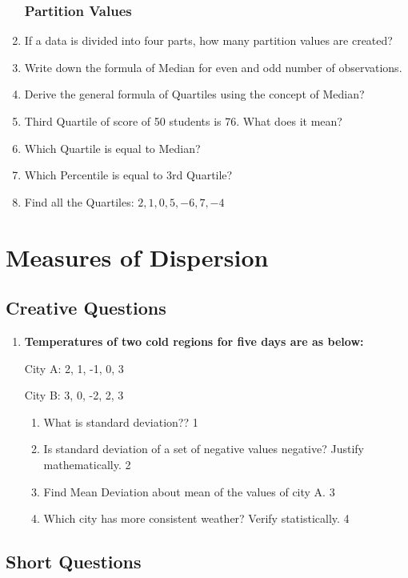 \documentclass[a4paper,oneside]{book}
\begin{document}
\begin{enumerate}
\subsection{Partition Values}
    \item If a data is divided into four parts, how many partition values are created?
    \item Write down the formula of Median for even and odd number of observations.
    \item Derive the general formula of Quartiles using the concept of Median?
    \item Third Quartile of score of 50 students is 76. What does it mean?
    \item Which Quartile is equal to Median?
    \item Which Percentile is equal to 3rd Quartile?
    \item Find all the Quartiles: $2,1,0,5,-6,7,-4$

    
\end{enumerate}

\chapter{Measures of Dispersion} 
\section{Creative Questions}

\begin{enumerate}
    \item
  \textbf{Temperatures of two cold regions for five days are as below:}

    City A: 2, 1, -1, 0, 3

    City B: 3, 0, -2, 2, 3
  \begin{enumerate}
    \item
	What is standard deviation?? \hfill 1
    \item
	Is standard deviation of a set of negative values negative? Justify mathematically. \hfill 2
    \item  
	Find Mean Deviation about mean of the values of city A.  \hfill 3
    \item
	Which city has more consistent weather? Verify statistically. \hfill 4
\end{enumerate}


\end{enumerate}

\section{Short Questions}
\end{document}
